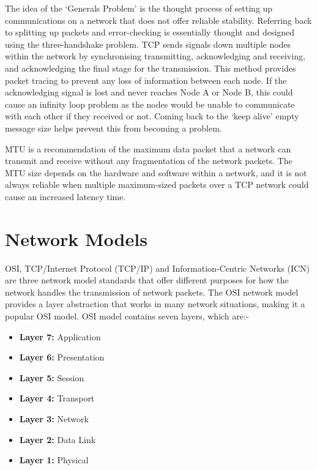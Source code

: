 \documentclass[conference]{IEEEtran}
\begin{document}
      The idea of the `Generals Problem' is the thought process of setting up communications on a network that does not offer reliable stability. Referring back to splitting up packets and error-checking is essentially thought and designed using the three-handshake problem. TCP sends signals down multiple nodes within the network by synchronising transmitting, acknowledging and receiving, and acknowledging the final stage for the transmission. This method provides packet tracing to prevent any loss of information between each node. If the acknowledging signal is lost and never reaches Node A or Node B, this could cause an infinity loop problem as the nodes would be unable to communicate with each other if they received or not. Coming back to the `keep alive' empty message size helps prevent this from becoming a problem.

      MTU is a recommendation of the maximum data packet that a network can transmit and receive without any fragmentation of the network packets. The MTU size depends on the hardware and software within a network, and it is not always reliable when multiple maximum-sized packets over a TCP network could cause an increased latency time.

    \section{Network Models}
    \label{sec:networkModel}
      OSI, TCP/Internet Protocol (TCP/IP) and Information-Centric Networks (ICN) are three network model standards that offer different purposes for how the network handles the transmission of network packets. The OSI network model provides a layer abstraction that works in many network situations, making it a popular OSI model. OSI model contains seven layers, which are:-
      \begin{itemize}
        \item[] \textbf{Layer 7:} Application
        \item[] \textbf{Layer 6:} Presentation
        \item[] \textbf{Layer 5:} Session
        \item[] \textbf{Layer 4:} Transport
        \item[] \textbf{Layer 3:} Network
        \item[] \textbf{Layer 2:} Data Link
        \item[] \textbf{Layer 1:} Physical
      \end{itemize}
\end{document}

